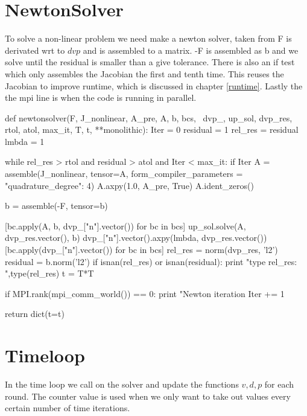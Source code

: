 \section{NewtonSolver}
To solve a non-linear problem we need make a newton solver, taken from \cite{White2006} F is derivated wrt to $dvp$ and is assembled to a matrix. -F is assembled as b and we solve until the residual is smaller than a give tolerance. There is also an if test which only assembles the Jacobian the first and tenth time. This reuses the Jacobian to improve runtime, which is discussed in chapter \ref{runtime}. Lastly the the mpi line is when the code is running in parallel.
\begin{python}
def newtonsolver(F, J_nonlinear, A_pre, A, b, bcs, \
                dvp_, up_sol, dvp_res, rtol, atol, max_it, T, t, **monolithic):
    Iter      = 0
    residual   = 1
    rel_res    = residual
    lmbda = 1

    while rel_res > rtol and residual > atol and Iter < max_it:
        if Iter %
            A = assemble(J_nonlinear, tensor=A, form_compiler_parameters = {"quadrature_degree": 4})
            A.axpy(1.0, A_pre, True)
            A.ident_zeros()

        b = assemble(-F, tensor=b)

        [bc.apply(A, b, dvp_["n"].vector()) for bc in bcs]
        up_sol.solve(A, dvp_res.vector(), b)
        dvp_["n"].vector().axpy(lmbda, dvp_res.vector())
        [bc.apply(dvp_["n"].vector()) for bc in bcs]
        rel_res = norm(dvp_res, 'l2')
        residual = b.norm('l2')
        if isnan(rel_res) or isnan(residual):
            print "type rel_res: ",type(rel_res)
            t = T*T

        if MPI.rank(mpi_comm_world()) == 0:
            print "Newton iteration %
        Iter += 1

    return dict(t=t)
\end{python}


\section{Timeloop}
In the time loop we call on the solver and update the functions $ v,d,p$ for each round. The counter value is used when we only want to take out values every certain number of time iterations.


